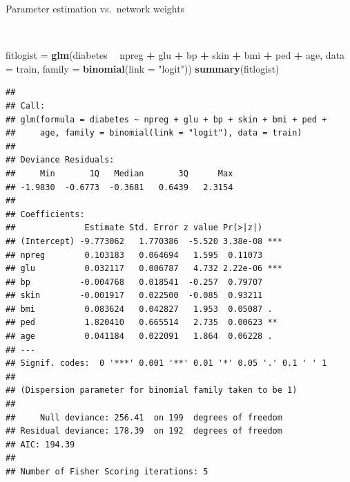 \documentclass[10pt,ignorenonframetext,]{beamer}
\newenvironment{Shaded}{\begin{snugshade}}{\end{snugshade}}
\newcommand{\DataTypeTok}[1]{\textcolor[rgb]{0.13,0.29,0.53}{#1}}
\newcommand{\KeywordTok}[1]{\textcolor[rgb]{0.13,0.29,0.53}{\textbf{#1}}}
\newcommand{\NormalTok}[1]{#1}
\newcommand{\OperatorTok}[1]{\textcolor[rgb]{0.81,0.36,0.00}{\textbf{#1}}}
\newcommand{\StringTok}[1]{\textcolor[rgb]{0.31,0.60,0.02}{#1}}
\begin{document}
\begin{frame}[fragile]

\begin{block}{Parameter estimation vs.~network weights}

\(~\)

\scriptsize

\begin{Shaded}
\begin{Highlighting}[]
\NormalTok{fitlogist =}\StringTok{ }\KeywordTok{glm}\NormalTok{(diabetes }\OperatorTok{~}\StringTok{ }\NormalTok{npreg }\OperatorTok{+}\StringTok{ }\NormalTok{glu }\OperatorTok{+}\StringTok{ }\NormalTok{bp }\OperatorTok{+}\StringTok{ }\NormalTok{skin }\OperatorTok{+}\StringTok{ }\NormalTok{bmi }\OperatorTok{+}\StringTok{ }\NormalTok{ped }\OperatorTok{+}\StringTok{ }\NormalTok{age, }
    \DataTypeTok{data =}\NormalTok{ train, }\DataTypeTok{family =} \KeywordTok{binomial}\NormalTok{(}\DataTypeTok{link =} \StringTok{"logit"}\NormalTok{))}
\KeywordTok{summary}\NormalTok{(fitlogist)}
\end{Highlighting}
\end{Shaded}

\begin{verbatim}
## 
## Call:
## glm(formula = diabetes ~ npreg + glu + bp + skin + bmi + ped + 
##     age, family = binomial(link = "logit"), data = train)
## 
## Deviance Residuals: 
##     Min       1Q   Median       3Q      Max  
## -1.9830  -0.6773  -0.3681   0.6439   2.3154  
## 
## Coefficients:
##              Estimate Std. Error z value Pr(>|z|)    
## (Intercept) -9.773062   1.770386  -5.520 3.38e-08 ***
## npreg        0.103183   0.064694   1.595  0.11073    
## glu          0.032117   0.006787   4.732 2.22e-06 ***
## bp          -0.004768   0.018541  -0.257  0.79707    
## skin        -0.001917   0.022500  -0.085  0.93211    
## bmi          0.083624   0.042827   1.953  0.05087 .  
## ped          1.820410   0.665514   2.735  0.00623 ** 
## age          0.041184   0.022091   1.864  0.06228 .  
## ---
## Signif. codes:  0 '***' 0.001 '**' 0.01 '*' 0.05 '.' 0.1 ' ' 1
## 
## (Dispersion parameter for binomial family taken to be 1)
## 
##     Null deviance: 256.41  on 199  degrees of freedom
## Residual deviance: 178.39  on 192  degrees of freedom
## AIC: 194.39
## 
## Number of Fisher Scoring iterations: 5
\end{verbatim}

\end{block}

\end{frame}
\end{document}
